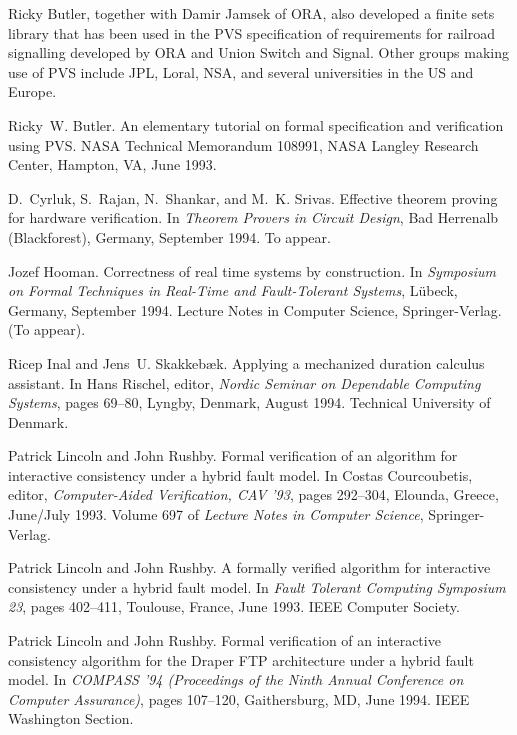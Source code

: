 Ricky Butler, together with Damir Jamsek of ORA, also developed a
finite sets library that has been used in the PVS specification of
requirements for railroad signalling developed by ORA and Union Switch
and Signal.  Other groups making use of PVS include JPL, Loral, NSA,
and several universities in the US and Europe.


\begin{thebibliography}{10}

Ricky~W. Butler.
\newblock An elementary tutorial on formal specification and verification using
  {PVS}.
\newblock NASA Technical Memorandum 108991, NASA Langley Research Center,
  Hampton, VA, June 1993.

D.~Cyrluk, S.~Rajan, N.~Shankar, and M.~K. Srivas.
\newblock Effective theorem proving for hardware verification.
\newblock In {\em Theorem Provers in Circuit Design}, Bad Herrenalb
  (Blackforest), Germany, September 1994.
\newblock To appear.

Jozef Hooman.
\newblock Correctness of real time systems by construction.
\newblock In {\em Symposium on Formal Techniques in Real-Time and
  Fault-Tolerant Systems}, L\"{u}beck, Germany, September 1994. Lecture Notes
  in Computer Science, Springer-Verlag.
\newblock (To appear).

Ricep Inal and Jens~U. Skakkeb{\ae}k.
\newblock Applying a mechanized duration calculus assistant.
\newblock In Hans Rischel, editor, {\em Nordic Seminar on Dependable Computing
  Systems}, pages 69--80, Lyngby, Denmark, August 1994. Technical University of
  Denmark.

Patrick Lincoln and John Rushby.
\newblock Formal verification of an algorithm for interactive consistency under
  a hybrid fault model.
\newblock In Costas Courcoubetis, editor, {\em Computer-Aided Verification, CAV
  '93}, pages 292--304, Elounda, Greece, June/July 1993. Volume 697 of {\em
  Lecture Notes in Computer Science}, Springer-Verlag.

Patrick Lincoln and John Rushby.
\newblock A formally verified algorithm for interactive consistency under a
  hybrid fault model.
\newblock In {\em Fault Tolerant Computing Symposium 23}, pages 402--411,
  Toulouse, France, June 1993. IEEE Computer Society.

Patrick Lincoln and John Rushby.
\newblock Formal verification of an interactive consistency algorithm for the
  {Draper FTP} architecture under a hybrid fault model.
\newblock In {\em COMPASS '94 (Proceedings of the Ninth Annual Conference on
  Computer Assurance)}, pages 107--120, Gaithersburg, MD, June 1994. IEEE
  Washington Section.


\end{thebibliography}

